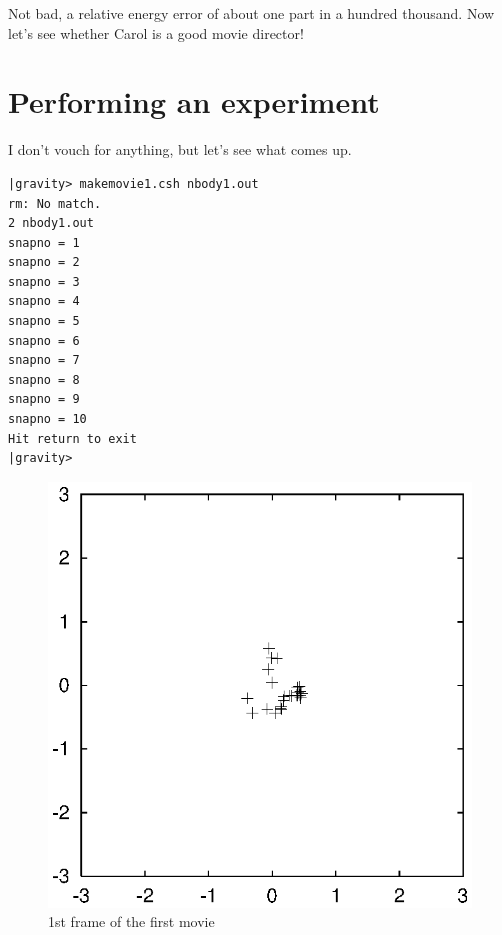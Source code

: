 \abc

\bob
Not bad, a relative energy error of about one part in a hundred
thousand.  Now let's see whether Carol is a good movie director!

\cba

\section{Performing an experiment}

\abc

\carol
I don't vouch for anything, but let's see what comes up.

\cba

\begin{small}
\begin{verbatim}
|gravity> makemovie1.csh nbody1.out
rm: No match.
2 nbody1.out
snapno = 1
snapno = 2
snapno = 3
snapno = 4
snapno = 5
snapno = 6
snapno = 7
snapno = 8
snapno = 9
snapno = 10
Hit return to exit
|gravity>
\end{verbatim}
\end{small}


\begin{figure}[htb]
\centering
\includegraphics[width=4.5in]{chap10/movietmp_nbody1.out.0.ps}
\caption[1st frame of movie \#1]
{1st frame of the first movie}
\label{fig:movie1.1}
\end{figure}

